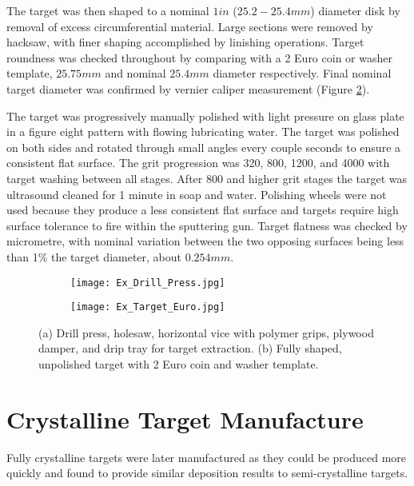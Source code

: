 The target was then shaped to a nominal $1 in$ ($25.2 - 25.4 mm$) diameter disk by removal of excess circumferential material. Large sections were removed by hacksaw, with finer shaping accomplished by linishing operations. Target roundness was checked throughout by comparing with a 2 Euro coin or washer template, $25.75 mm$ and nominal $25.4 mm$ diameter respectively. Final nominal target diameter was confirmed by vernier caliper measurement (Figure \ref{fig:TargetEuro}). 

The target was progressively manually polished with light pressure on glass plate in a figure eight pattern with flowing lubricating water. The target was polished on both sides and rotated through small angles every couple seconds to ensure a consistent flat surface. The grit progression was 320, 800, 1200, and 4000 with target washing between all stages. After 800 and higher grit stages the target was ultrasound cleaned for 1 minute in soap and water. Polishing wheels were not used because they produce a less consistent flat surface and targets require high surface tolerance to fire within the sputtering gun. Target flatness was checked by micrometre, with nominal variation between the two opposing surfaces being less than 1\% the target diameter, about $0.254 mm$. 

\begin{figure}[htbp]
	\centering
	\begin{subfigure}[htbp]{0.30\textwidth}
		\texttt{[image: Ex\_Drill\_Press.jpg]}
		\caption{}
		\label{fig:DrillPress}
	\end{subfigure}
	\begin{subfigure}[htbp]{0.38\textwidth}
		\texttt{[image: Ex\_Target\_Euro.jpg]}
		\caption{}
		\label{fig:TargetEuro}
	\end{subfigure}
	\caption{(a) Drill press, holesaw, horizontal vice with polymer grips, plywood damper, and drip tray for target extraction. (b) Fully shaped, unpolished target with 2 Euro coin and washer template.}%
	\label{fig:ShapingEquipment}
\end{figure}

\section{Crystalline Target Manufacture}
Fully crystalline targets were later manufactured as they could be produced more quickly and found to provide similar deposition results to semi-crystalline targets.

